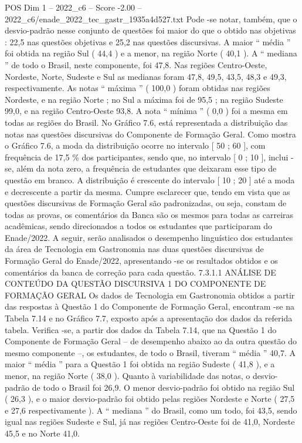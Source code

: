 \begin{textsample}{POS Dim 1 – 2022\_c6 – Score -2.00 – 2022\_c6/enade\_2022\_tec\_gastr\_1935a4d527.txt}
Pode -se notar, também, que o desvio-padrão nesse conjunto de questões foi maior do que o obtido nas objetivas : 22,5 nas questões objetivas e 25,2 nas questões discursivas.
A maior “ média ” foi obtida na região Sul ( 44,4 ) e a menor, na região Norte ( 40,1 ).
A “ mediana ” de todo o Brasil, neste componente, foi 47,8.
Nas regiões Centro-Oeste, Nordeste, Norte, Sudeste e Sul as medianas foram 47,8, 49,5, 43,5, 48,3 e 49,3, respectivamente.
As notas “ máxima ” ( 100,0 ) foram obtidas nas regiões Nordeste, e na região Norte ; no Sul a máxima foi de 95,5 ; na região Sudeste 99,0, e na região Centro-Oeste 93,8.
A nota “ mínima ” ( 0,0 ) foi a mesma em todas as regiões do Brasil.
No Gráfico 7.6, está representada a distribuição das notas nas questões discursivas do Componente de Formação Geral.
Como mostra o Gráfico 7.6, a moda da distribuição ocorre no intervalo [ 50 ; 60 ], com frequência de 17,5 \% dos participantes, sendo que, no intervalo [ 0 ; 10 ], inclui -se, além da nota zero, a frequência de estudantes que deixaram esse tipo de questão em branco.
A distribuição é crescente do intervalo [ 10 ; 20 ] até a moda e decrescente a partir da mesma.
Cumpre esclarecer que, tendo em vista que as questões discursivas de Formação Geral são padronizadas, ou seja, constam de todas as provas, os comentários da Banca são os mesmos para todas as carreiras acadêmicas, sendo direcionados a todos os estudantes que participaram do Enade/2022.
A seguir, serão analisados o desempenho linguístico dos estudantes da área de Tecnologia em Gastronomia nas duas questões discursivas de Formação Geral do Enade/2022, apresentando -se os resultados obtidos e os comentários da banca de correção para cada questão. 7.3.1.1 ANÁLISE DE CONTEÚDO DA QUESTÃO DISCURSIVA 1 DO COMPONENTE DE FORMAÇÃO GERAL Os dados de Tecnologia em Gastronomia obtidos a partir das respostas à Questão 1 do Componente de Formação Geral, encontram -se na Tabela 7.14 e no Gráfico 7.7, exposto após a apresentação dos dados da referida tabela.
Verifica -se, a partir dos dados da Tabela 7.14, que na Questão 1 do Componente de Formação Geral – de desempenho abaixo ao da outra questão do mesmo componente –, os estudantes, de todo o Brasil, tiveram “ média ” 40,7.
A maior “ média ” para a Questão 1 foi obtida na região Sudeste ( 41,8 ), e a menor, na região Norte ( 38,0 ).
Quanto à variabilidade das notas, o desvio-padrão de todo o Brasil foi 26,9.
O menor desvio-padrão foi obtido na região Sul ( 26,3 ), e o maior desvio-padrão foi obtido pelas regiões Nordeste e Norte ( 27,5 e 27,6 respectivamente ).
A “ mediana ” do Brasil, como um todo, foi 43,5, sendo igual nas regiões Sudeste e Sul, já nas regiões Centro-Oeste foi de 41,0, Nordeste 45,5 e no Norte 41,0.

\end{textsample}
